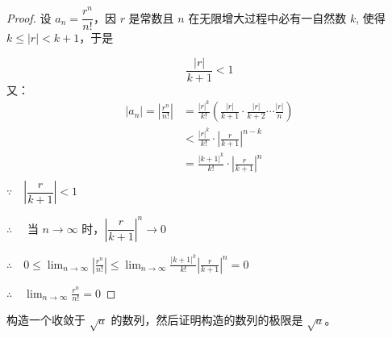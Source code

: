 \begin{proof}
{\linespread{1.6}\selectfont 设 $a_n=\dfrac{r^n}{n!}$，因 $r$ 是常数且 $n$ 在无限增大过程中必有一自然数 $k$, 使得 $k\leqslant |r|<k+1$，于是\par}
\[\frac{|r|}{k+1}<1\]
又：
\[\begin{split}
|a_n|=\left|\frac{r^n}{n!}\right|&=\frac{|r|^k}{k!}\left(\frac{|r|}{k+1}\cdot \frac{|r|}{k+2}\cdots \frac{|r|}{n}\right)\\
&<\frac{|r|^k}{k!}\cdot \left|\frac{r}{k+1}\right|^{n-k}\\
&=\frac{|k+1|^k}{k!}\cdot \left|\frac{r}{k+1}\right|^{n}\\
\end{split}\]
$\because\quad  \left|\dfrac{r}{k+1}\right|<1$

$\therefore\quad$ 当 $n\to\infty$ 时，$\left|\dfrac{r}{k+1}\right|^n\to 0$
    
$\displaystyle \therefore\quad 0\leqslant \lim_{n\to\infty}\left|\frac{r^n}{n!}\right|\le \lim_{n\to\infty}\frac{|k+1|^k}{k!} \left|\frac{r}{k+1}\right|^{n}=0$

$\displaystyle\therefore\quad \lim_{n\to\infty}\frac{r^n}{n!}=0$
\end{proof}

\begin{example}
  构造一个收敛于 $\sqrt{a}$ 的数列，然后证明构造的数列的极限是 $\sqrt{a}$。
\end{example}

